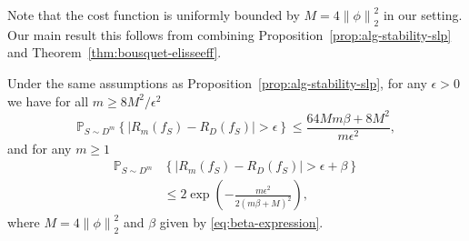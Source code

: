 \documentclass[letterpaper]{article} %
\begin{document}
Note that the cost function is uniformly bounded by $M=4 \left\| \phi \right\|_2^2$ in our setting. Our main result this follows from combining  Proposition~\ref{prop:alg-stability-slp} and Theorem~\ref{thm:bousquet-elisseeff}.
\begin{theorem}\label{Thm:Gen_Error_Soft}
  Under the same assumptions as Proposition~\ref{prop:alg-stability-slp}, for any $\epsilon>0$ we have for all $m\geq 8M^2/\epsilon^2$
  \begin{equation}
    \label{eq:fraction-bounds-1}
    \mathbb{P}_{S\sim D^m} \left\{ \left| R_m \left( f_S \right)-R_D \left( f_S \right) \right| > \epsilon\right\}\leq \frac{64 Mm\beta+8M^2}{m\epsilon^2},
  \end{equation}
  and for any $m\geq 1$
  \begin{equation}
    \label{eq:exponential-bounds-1}
    \begin{aligned}
    \mathbb{P}_{S\sim D^m}&\left\{ \left| R_m \left( f_S \right)-R_D \left( f_S \right) \right| > \epsilon+\beta\right\}\\
    &\leq 2\exp \left( -\frac{m\epsilon^2}{2 \left( m\beta+M \right)^2} \right),
    \end{aligned}
  \end{equation}
  where $M=4\left\| \phi \right\|_2^2$ and $\beta$ given by \eqref{eq:beta-expression}.
\end{theorem}


\end{document}
